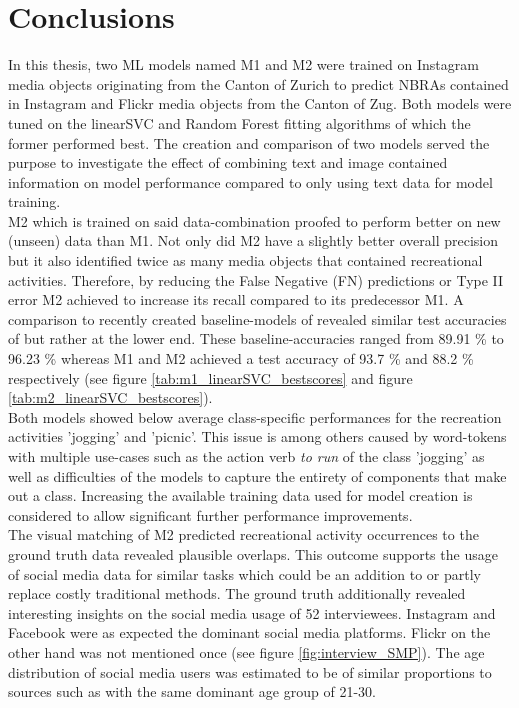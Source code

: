 \chapter{Conclusions} \label{conclusion_outlook}

In this thesis, two ML models named M1 and M2 were trained on Instagram media objects originating from the Canton of Zurich to predict NBRAs contained in Instagram and Flickr media objects from the Canton of Zug. Both models were tuned on the linearSVC and Random Forest fitting algorithms of which the former performed best. The creation and comparison of two models served the purpose to investigate the effect of combining text and image contained information on model performance compared to only using text data for model training.\\
M2 which is trained on said data-combination proofed to perform better on new (unseen) data than M1. Not only did M2 have a slightly better overall precision but it also identified twice as many media objects that contained recreational activities. Therefore, by reducing the False Negative (FN) predictions or Type II error M2 achieved to increase its recall compared to its predecessor M1. A comparison to recently created baseline-models of \parencite{Das2018, Li2018} revealed similar test accuracies of but rather at the lower end. These baseline-accuracies ranged from 89.91 \% to 96.23 \% whereas M1 and M2 achieved a test accuracy of 93.7 \% and 88.2 \% respectively (see figure \ref{tab:m1_linearSVC_bestscores} and figure \ref{tab:m2_linearSVC_bestscores}). \\

Both models showed below average class-specific performances for the recreation activities 'jogging' and 'picnic'. This issue is among others caused by word-tokens with multiple use-cases such as the action verb \textit{to run} of the class 'jogging' as well as difficulties of the models to capture the entirety of components that make
out a class. Increasing the available training data used for model creation is considered to allow significant further performance improvements.\\ 

The visual matching of M2 predicted recreational activity occurrences to the ground truth data revealed plausible overlaps. This outcome supports the usage of social media data for similar tasks which could be an addition to or partly replace costly traditional methods. The ground truth additionally revealed interesting insights on the social media usage of 52 interviewees. Instagram and Facebook were as expected the dominant social media platforms. Flickr on the other hand was not mentioned once (see figure \ref{fig:interview_SMP}). The age distribution of social media users was estimated to be of similar proportions to sources such as \parencite{2013} with the same dominant age group of 21-30.

